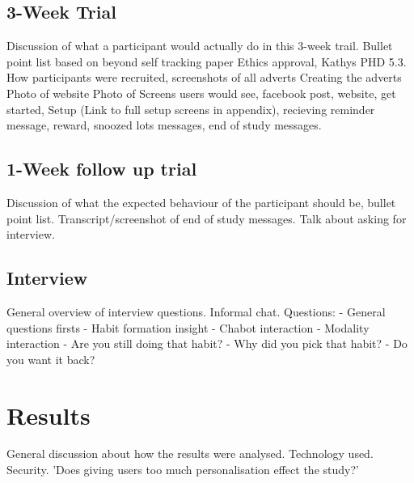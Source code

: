 \subsection{3-Week Trial}

Discussion of what a participant would actually do in this 3-week trail.\newline
Bullet point list based on beyond self tracking paper\newline
Ethics approval, Kathys PHD 5.3.\newline
How participants were recruited, screenshots of all adverts\newline
Creating the adverts\newline
Photo of website\newline
Photo of Screens users would see, facebook post, website, get started, Setup (Link to full setup screens in appendix), recieving reminder message, reward, snoozed lots messages, end of study messages.\newline


\subsection{1-Week follow up trial}

Discussion of what the expected behaviour of the participant should be, bullet point list.\newline
Transcript/screenshot of end of study messages.\newline
Talk about asking for interview.

\subsection{Interview}

General overview of interview questions.\newline
Informal chat.\newline
Questions:
  - General questions firsts
  - Habit formation insight
  - Chabot interaction
  - Modality interaction
  - Are you still doing that habit?
  - Why did you pick that habit?
  - Do you want it back?


\section{Results}

General discussion about how the results were analysed. Technology used. Security.\newline
'Does giving users too much personalisation effect the study?'\newline


